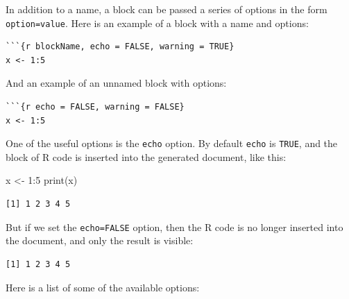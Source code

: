 \documentclass[
  letterpaper,
  DIV=11,
  numbers=noendperiod]{scrreprt}
\newenvironment{Shaded}{\begin{snugshade}}{\end{snugshade}}
\newcommand{\DecValTok}[1]{\textcolor[rgb]{0.68,0.00,0.00}{#1}}
\newcommand{\FunctionTok}[1]{\textcolor[rgb]{0.28,0.35,0.67}{#1}}
\newcommand{\NormalTok}[1]{\textcolor[rgb]{0.00,0.23,0.31}{#1}}
\newcommand{\OtherTok}[1]{\textcolor[rgb]{0.00,0.23,0.31}{#1}}
\newcommand{\SpecialCharTok}[1]{\textcolor[rgb]{0.37,0.37,0.37}{#1}}
\begin{document}
In addition to a name, a block can be passed a series of options in the
form \texttt{option=value}. Here is an example of a block with a name
and options:

\begin{verbatim}
```{r blockName, echo = FALSE, warning = TRUE}
x <- 1:5
\end{verbatim}

And an example of an unnamed block with options:

\begin{verbatim}
```{r echo = FALSE, warning = FALSE}
x <- 1:5
\end{verbatim}

One of the useful options is the \texttt{echo} option. By default
\texttt{echo} is \texttt{TRUE}, and the block of R code is inserted into
the generated document, like this:

\begin{Shaded}
\begin{Highlighting}[]
\NormalTok{x }\OtherTok{\textless{}{-}} \DecValTok{1}\SpecialCharTok{:}\DecValTok{5}
\FunctionTok{print}\NormalTok{(x)}
\end{Highlighting}
\end{Shaded}

\begin{verbatim}
[1] 1 2 3 4 5
\end{verbatim}

But if we set the \texttt{echo=FALSE} option, then the R code is no
longer inserted into the document, and only the result is visible:

\begin{verbatim}
[1] 1 2 3 4 5
\end{verbatim}

Here is a list of some of the available options:
\end{document}
